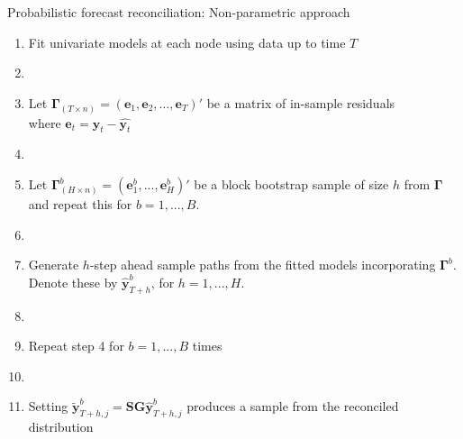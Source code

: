 \documentclass[11pt,xcolor=dvipsnames,handout]{beamer} %
\newcounter{saveenumi}
\newcommand{\seti}{\setcounter{saveenumi}{\value{enumi}}}
\begin{document}
\begin{frame}{Probabilistic forecast reconciliation: Non-parametric approach}
\begin{enumerate}[<+-| alert@+>]
\item Fit univariate models at each node using data up to time $T$
\item[]
\item Let $\bm{\Gamma}_{(T \times n)}=(\bm{e}_1,\bm{e}_2,\dots,\bm{e}_T)'$ be a matrix of in-sample residuals\\
where $\bm{e}_t=\bm{y}_t-\hat{\bm{y}_t}$ 
\item[]
\item Let $\bm{\Gamma}^b_{(H \times n)} = (\bm{e}^b_1,...,\bm{e}^b_H)'$ be a block bootstrap sample of size $h$ from $\bm{\Gamma}$ and repeat this for $b = 1,...,B$.  
\item[]
\item Generate $h$-step ahead sample paths from the fitted models incorporating $\bm{\Gamma}^b$. Denote these by $\hat{\bm{y}}^b_{T+h}$, for $h=1,...,H$.
\item[]
\item  Repeat step 4 for $b = 1,...,B$ times
\item[]
\item Setting $\tilde{\bm{y}}_{T+h,j}^b = \bm{SG}\hat{\bm{y}}_{T+h,j}^b$ produces a sample from the reconciled distribution

\seti
\end{enumerate}
\end{frame}
%
%
\end{document}

